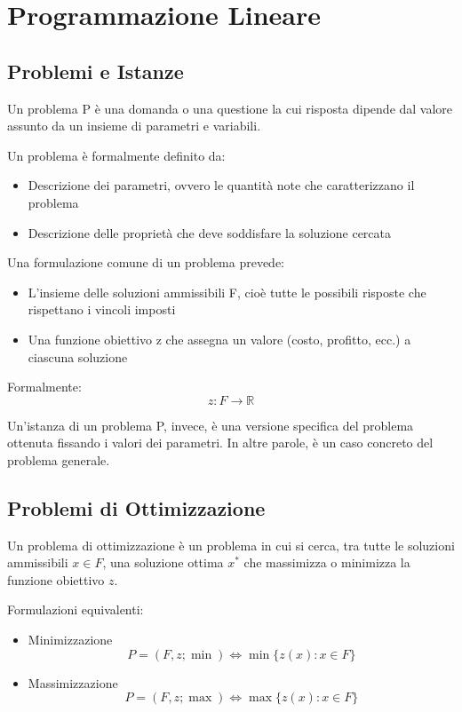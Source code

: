 
\chapter{Programmazione Lineare}

\section{Problemi e Istanze}
Un problema P è una domanda o una questione la cui risposta dipende dal valore assunto da un insieme di parametri e variabili.

Un problema è formalmente definito da:
\begin{itemize}
    \item Descrizione dei parametri, ovvero le quantità note che caratterizzano il problema
    \item Descrizione delle proprietà che deve soddisfare la soluzione cercata
\end{itemize}

Una formulazione comune di un problema prevede:
\begin{itemize}
    \item L'insieme delle soluzioni ammissibili F, cioè tutte le possibili risposte che rispettano i vincoli imposti
    \item Una funzione obiettivo z che assegna un valore (costo, profitto, ecc.) a ciascuna soluzione
\end{itemize}

Formalmente:
\begin{equation}
z \colon F \rightarrow \mathbb{R}
\end{equation}

Un'istanza di un problema P, invece, è una versione specifica del problema ottenuta fissando i valori dei parametri. In altre parole, è un caso concreto del problema generale.

\section{Problemi di Ottimizzazione}
Un problema di ottimizzazione è un problema in cui si cerca, tra tutte le soluzioni ammissibili $x \in F$, una soluzione ottima $x^*$ che massimizza o minimizza la funzione obiettivo $z$.

Formulazioni equivalenti:
\begin{itemize}
    \item Minimizzazione
    \begin{equation}
    P = (F, z; \min) \Leftrightarrow \min\{z(x) : x \in F\}
    \end{equation}
    
    \item Massimizzazione
    \begin{equation}
    P = (F, z; \max) \Leftrightarrow \max\{z(x) : x \in F\}
    \end{equation}
\end{itemize}


